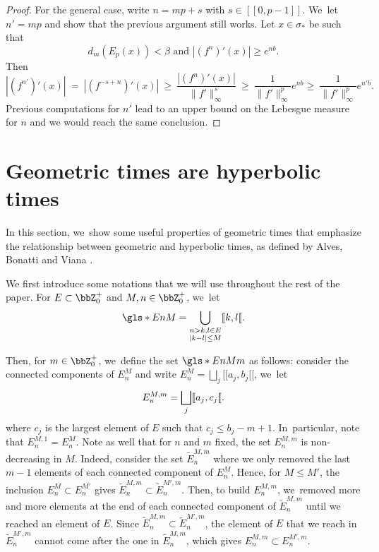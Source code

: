 \begin{proof}
For the general case, write $n = mp + s$ with $s \in [\![ 0, p-1 ]\!]$. We~let $n' = mp$ and show that the previous argument still works.
Let $x \in \sigma_*$ be such that
\[
d_m(E_p(x)) < \beta \text{ and } |(f^n)'(x)| \geq e^{nb}.
\]
Then
\[
|(f^{n'})'(x)| \: = \: |(f^{-s + n})'(x)|
\: \geq \: \frac{| (f^n)'(x)|}{\| f' \|_{\infty}^s}
\: \geq \: \frac{1}{\| f' \|_{\infty}^p} e^{nb}
\geq \: \frac{1}{\| f' \|_{\infty}^p} e^{n'b}.
\]
Previous computations for $n'$ lead to an upper bound on the Lebesgue measure for $n$ and we would reach the same conclusion.
\end{proof}

\section{Geometric times are hyperbolic times}
\label{sec:tpsHB}

In this section, we~show some useful properties of geometric times that emphasize the relationship between geometric and hyperbolic times, as defined by Alves, Bonatti and Viana \cite{Alves2000}.

We first introduce some notations that we will use throughout the rest of the paper.
For $E \subset \bbZ_0^+$ and $M,n \in \bbZ_0^+$, we~let\vspace*{-3pt}
\[
\gls*{EnM} = \bigcup_{\substack{n > k,l \in E\\
|k-l| \leq M}} [ \! [ k, l [ \! [.
\]

Then, for $m \in \bbZ_0^+$, we~define the set $\gls*{EnMm}$ as follows:
consider the connected components of $E_n^M$ and write $E_n^M = \bigsqcup_j [\![ a_j, b_j [\![$, we~let\vspace*{-3pt}\enlargethispage{.3\baselineskip}
\[
E_n^{M,m} = \bigsqcup_{j} [\![ a_j, c_j [\![.\vspace*{-3pt}
\]
where $c_j$ is the largest element of $E$ such that $c_j \leq b_j - m +1$. In~particular, note that $E_n^{M,1} = E_n^M$.
Note as well that for $n$ and $m$ fixed, the set $E_n^{M,m}$ is non-decreasing in $M$.
Indeed, consider the set $\widetilde{E}_n^{M,m}$ where we only removed the last $m-1$ elements of each connected component of $E_n^M$.
Hence, for $M \leq M'$, the inclusion $E_n^M \subset E_n^{M'}$ gives $\widetilde{E}_n^{M,m} \subset \widetilde{E}_n^{M',m}$. Then, to build $E_n^{M,m}$, we~removed more and more elements at the end of each connected component of $\widetilde{E}_n^{M,m}$ until we reached an element of $E$.
Since $\widetilde{E}_n^{M,m} \subset \widetilde{E}_n^{M',m}$, the element of $E$ that we reach in $\widetilde{E}_n^{M',m}$ cannot come after the one in $\widetilde{E}_n^{M,m}$, which gives $E_n^{M,m} \subset E_n^{M',m}$.

